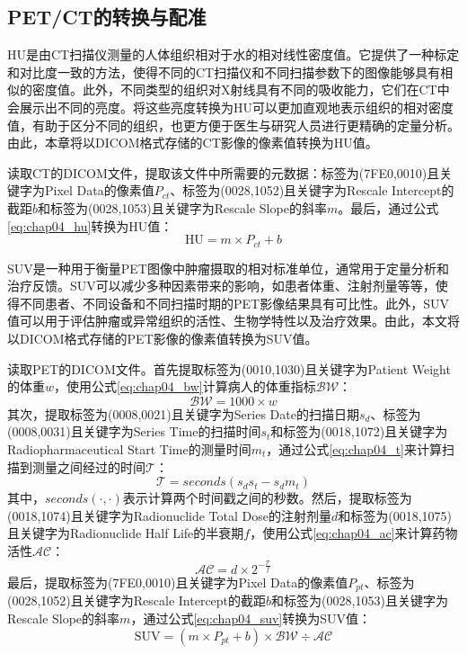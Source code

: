 \subsection{{\tm PET/CT}的转换与配准}

HU是由CT扫描仪测量的人体组织相对于水的相对线性密度值。它提供了一种标定和对比度一致的方法，使得不同的CT扫描仪和不同扫描参数下的图像能够具有相似的密度值。此外，不同类型的组织对X射线具有不同的吸收能力，它们在CT中会展示出不同的亮度。将这些亮度转换为HU可以更加直观地表示组织的相对密度值，有助于区分不同的组织，也更方便于医生与研究人员进行更精确的定量分析。由此，本章将以DICOM格式存储的CT影像的像素值转换为HU值。

读取CT的DICOM文件，提取该文件中所需要的元数据：标签为(7FE0,0010)且关键字为Pixel Data的像素值\(P_{ct}\)、标签为(0028,1052)且关键字为Rescale Intercept的截距\(b\)和标签为(0028,1053)且关键字为Rescale Slope的斜率\(m\)。最后，通过公式\ref{eq:chap04_hu}转换为HU值：
\begin{equation}
  \text{HU} = m \times P_{ct} + b
  \label{eq:chap04_hu}
\end{equation}

SUV是一种用于衡量PET图像中肿瘤摄取的相对标准单位，通常用于定量分析和治疗反馈。SUV可以减少多种因素带来的影响，如患者体重、注射剂量等等，使得不同患者、不同设备和不同扫描时期的PET影像结果具有可比性。此外，SUV值可以用于评估肿瘤或异常组织的活性、生物学特性以及治疗效果。由此，本文将以DICOM格式存储的PET影像的像素值转换为SUV值。

读取PET的DICOM文件。首先提取标签为(0010,1030)且关键字为Patient Weight的体重\(w\)，使用公式\ref{eq:chap04_bw}计算病人的体重指标\(\mathcal{BW}\)：
\begin{equation}
  \mathcal{BW} = 1000 \times w
  \label{eq:chap04_bw}
\end{equation}
其次，提取标签为(0008,0021)且关键字为Series Date的扫描日期\(s_d\)、标签为(0008,0031)且关键字为Series Time的扫描时间\(s_t\)和标签为(0018,1072)且关键字为Radiopharmaceutical Start Time的测量时间\(m_t\)，通过公式\ref{eq:chap04_t}来计算扫描到测量之间经过的时间\(\mathcal{T}\)：
\begin{equation}
  \mathcal{T} = seconds(s_ds_t - s_dm_t)
  \label{eq:chap04_t}
\end{equation}
其中，\(seconds(\cdot, \cdot)\)表示计算两个时间戳之间的秒数。然后，提取标签为(0018,1074)且关键字为Radionuclide Total Dose的注射剂量\(d\)和标签为(0018,1075)且关键字为Radionuclide Half Life的半衰期\(f\)，使用公式\ref{eq:chap04_ac}来计算药物活性\(\mathcal{AC}\)：
\begin{equation}
  \mathcal{AC} = d \times 2^{-\frac{\mathcal{T}}{f}}
  \label{eq:chap04_ac}
\end{equation}
最后，提取标签为(7FE0,0010)且关键字为Pixel Data的像素值\(P_{pt}\)、标签为(0028,1052)且关键字为Rescale Intercept的截距\(b\)和标签为(0028,1053)且关键字为Rescale Slope的斜率\(m\)，通过公式\ref{eq:chap04_suv}转换为SUV值：
\begin{equation}
  \text{SUV} = (m \times P_{pt} + b) \times \mathcal{BW} \div \mathcal{AC}
  \label{eq:chap04_suv}
\end{equation}

